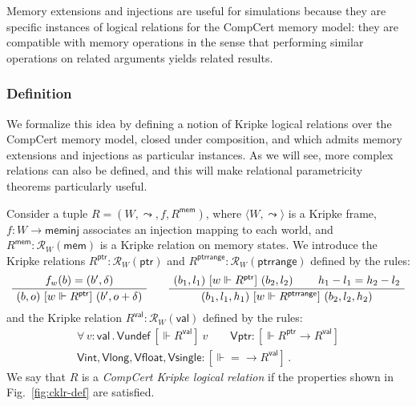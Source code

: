 \documentclass[acmsmall,timestamp,review,anonymous]{acmart}
\newcommand{\kw}[1]{\ensuremath{ \mathsf{#1} }}
\newcommand{\ifr}[1]{\ [{#1}]\ }
\begin{document}
Memory extensions and injections
are useful for simulations
because they are specific instances
of logical relations for the CompCert memory model:
they are compatible with memory operations
in the sense that
performing similar operations on related arguments
yields related results.

\subsubsection{Definition} %

We formalize this idea by defining
a notion of Kripke logical relations over the CompCert memory model,
closed under composition, and which
admits memory extensions and injections as particular instances.
As we will see,
more complex relations can also be defined,
and this will make relational parametricity theorems
particularly useful.

\begin{definition} \label{def:cklr} %
Consider a tuple $R = (W, \leadsto, f, R^\kw{mem})$,
where
$\langle W, \leadsto \rangle$ is a Kripke frame,
$f : W \rightarrow \kw{meminj}$
associates an injection mapping to each world, and
$R^\kw{mem} : \mathcal{R}_{W}(\kw{mem})$
is a Kripke relation on memory states.
We introduce the Kripke relations
$R^\kw{ptr} : \mathcal{R}_W(\kw{ptr})$ and
$R^\kw{ptrrange} : \mathcal{R}_W(\kw{ptrrange})$
defined by the rules:
\[
  \AxiomC{$f_w(b) = (b', \delta)$}
  \UnaryInfC{$(b, o) \ifr{w \Vdash R^\kw{ptr}} (b', o + \delta)$}
  \DisplayProof
  \qquad
  \AxiomC{$(b_1, l_1) \ifr{w \Vdash R^\kw{ptr}} (b_2, l_2)$}
  \AxiomC{$h_1 - l_1 = h_2 - l_2$}
  \BinaryInfC{$(b_1, l_1, h_1) \ifr{w \Vdash R^\kw{ptrrange}} (b_2, l_2, h_2)$}
  \DisplayProof
\]
and the Kripke relation
$R^\kw{val} : \mathcal{R}_W(\kw{val})$
defined by the rules:
\begin{gather*}
  \forall \, v : \kw{val} \,.\,
    \kw{Vundef} \ifr{\Vdash R^\kw{val}} v \qquad
  \kw{Vptr} : {}
    [\Vdash R^\kw{ptr} \rightarrow R^\kw{val}] \\
  \kw{Vint}, \kw{Vlong}, \kw{Vfloat}, \kw{Vsingle} :
    [\Vdash {=} \rightarrow R^\kw{val}] \,.
\end{gather*}
We say that $R$ is a \emph{CompCert Kripke logical relation}
if the properties shown in Fig.~\ref{fig:cklr-def} are satisfied.
\end{definition}
\end{document}
